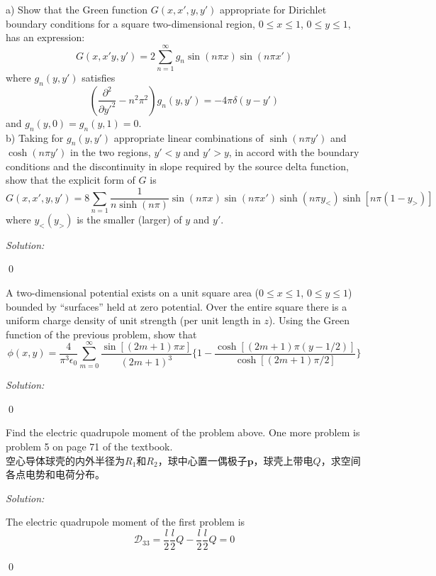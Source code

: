 \documentclass[12pt]{article}
\newenvironment{problem}[2][Problem]{\begin{trivlist}
\item[\hskip \labelsep {\bfseries #1}\hskip \labelsep {\bfseries #2.}]}{\end{trivlist}}
\newenvironment{sol}
    {\emph{Solution:}
    }
    {
    \qed
    }
\begin{document}
\begin{problem}{3}
a) Show that the Green function $G(x,x',y,y')$ appropriate for Dirichlet boundary conditions for a square two-dimensional region, $0\leq x\leq1$, $0\leq y\leq1$, has an expression:
\[
G(x,x'y,y')=2\sum_{n=1}^{\infty}g_n\sin(n\pi x)\sin(n\pi x')
\]
where $g_n(y,y')$ satisfies
\[
(\frac{\partial^2}{\partial y'^2}-n^2\pi^2)g_n(y,y')=-4\pi\delta(y-y')
\]
and $g_n(y,0)=g_n(y,1)=0$.\\
b) Taking for $g_n(y,y')$ appropriate linear combinations of $\sinh(n\pi y')$ and $\cosh(n\pi y')$ in the two regions, $y'<y$ and $y'>y$, in accord with the boundary conditions and the discontinuity in slope required by the source delta function, show that the explicit form of $G$ is
\[
G(x,x',y,y')=8\sum_{n=1}\frac{1}{n\sinh(n\pi)}\sin(n\pi x)\sin(n\pi x')\sinh(n\pi y_<)\sinh[n\pi(1-y_>)]
\]
where $y_<(y_>)$ is the smaller (larger) of $y$ and $y'$.
\end{problem}
\begin{sol}

\end{sol}

\begin{problem}{4}
A two-dimensional potential exists on a unit square area ($0\leq x\leq1$, $0\leq y\leq1$) bounded by “surfaces” held at zero potential. Over the entire square there is a uniform charge density of unit strength (per unit length in $z$). Using the Green function of the previous problem, show that
\[
\phi(x,y)=\frac{4}{\pi^3\epsilon_0}\sum_{m=0}^{\infty}\frac{\sin[(2m+1)\pi x]}{(2m+1)^3}\{1-\frac{\cosh[(2m+1)\pi(y-1/2)]}{\cosh[(2m+1)\pi/2]}\}
\]
\end{problem}
\begin{sol}

\end{sol}

\begin{problem}{5}
Find the electric quadrupole moment of the problem above. One more problem is problem 5 on page 71 of the textbook.\\
空心导体球壳的内外半径为$R_1$和$R_2$，球中心置一偶极子$\bm{p}$，球壳上带电$Q$，求空间各点电势和电荷分布。
\end{problem}
\begin{sol}
The electric quadrupole moment of the first problem is
\[
\mathscr{D}_{33}=\frac{l}{2}\frac{l}{2}Q-\frac{l}{2}\frac{l}{2}Q=0
\]
\end{sol}
\end{document}
